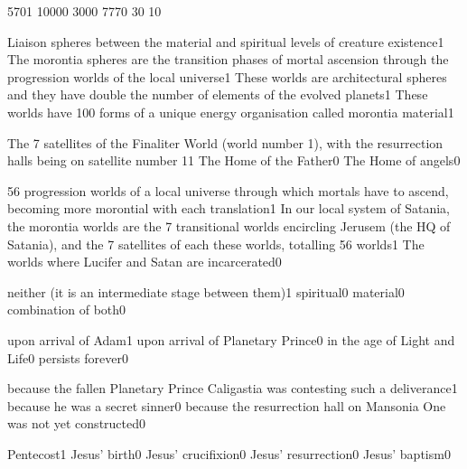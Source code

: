 {570}{1}
{1000}{0}
{300}{0}
{777}{0}
{3}{0}
{1}{0}
\qstop

{Liaison spheres between the material and spiritual levels of creature existence}{1}
{The morontia spheres are the transition phases of mortal ascension through the progression worlds of the local universe}{1}
{These worlds are architectural spheres and they have double the number of elements of the evolved planets}{1}
{These worlds have 100 forms of a unique energy organisation called morontia material}{1}
\qstop

{The 7 satellites of the Finaliter World (world number 1), with the resurrection halls being on satellite number 1}{1}
{The Home of the Father}{0}
{The Home of angels}{0}
\qstop

{56 progression worlds of a local universe through which mortals have to ascend, becoming more morontial with each translation}{1}
{In our local system of Satania, the morontia worlds are the 7 transitional worlds encircling Jerusem (the HQ of Satania), and the 7 satellites of each these worlds, totalling 56 worlds}{1}
{The worlds where Lucifer and Satan are incarcerated}{0}
\qstop

{neither (it is an intermediate stage between them)}{1}
{spiritual}{0}
{material}{0}
{combination of both}{0}
\qstop




{upon arrival of Adam}{1}
{upon arrival of Planetary Prince}{0}
{in the age of Light and Life}{0}
{persists forever}{0}
\qstop


{because the fallen Planetary Prince Caligastia was contesting such a deliverance}{1}
{because he was a secret sinner}{0}
{because the resurrection hall on Mansonia One was not yet constructed}{0}
\qstop

{Pentecost}{1}
{Jesus' birth}{0}
{Jesus' crucifixion}{0}
{Jesus' resurrection}{0}
{Jesus' baptism}{0}
\qstop

